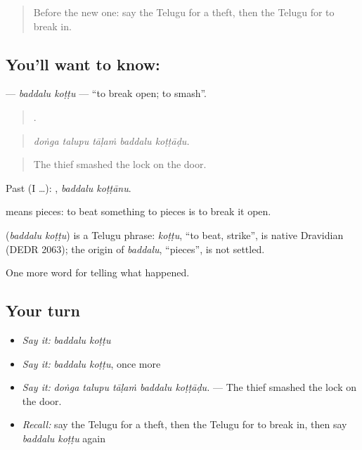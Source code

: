 \label{lesson:TE-C329-baddalu-kottu}



\begin{quote}
Before the new one: say the Telugu for a theft, then the Telugu for to break in.
\end{quote}

\subsection*{You'll want to know:  }
\textbf{ } — \emph{baddalu koṭṭu} — \textquotedblleft{}to break open; to smash\textquotedblright{}.

\begin{quote}
    .
\end{quote}

\begin{quote}
\emph{doṅga talupu tāḷaṁ baddalu koṭṭāḍu.}
\end{quote}

\begin{quote}
The thief smashed the lock on the door.
\end{quote}

Past (I …):  , \emph{baddalu koṭṭānu}.

 means pieces: to beat something to pieces is to break it open.

\begin{cousinweb}
\textbf{ } (\emph{baddalu koṭṭu}) is a Telugu phrase: \emph{koṭṭu}, \textquotedblleft{}to beat, strike\textquotedblright{}, is native Dravidian (DEDR 2063); the origin of \emph{baddalu}, \textquotedblleft{}pieces\textquotedblright{}, is not settled.
\end{cousinweb}

\begin{grammarlens}[title={What you've built}]
One more word for telling what happened.
\end{grammarlens}

\subsection*{Your turn}
\begin{itemize}
\raggedright
  \item \emph{Say it:} \emph{baddalu koṭṭu}
  \item \emph{Say it:} \emph{baddalu koṭṭu}, once more
  \item \emph{Say it:} \emph{doṅga talupu tāḷaṁ baddalu koṭṭāḍu.} — The thief smashed the lock on the door.
  \item \emph{Recall:} say the Telugu for a theft, then the Telugu for to break in, then say \emph{baddalu koṭṭu} again
\end{itemize}

